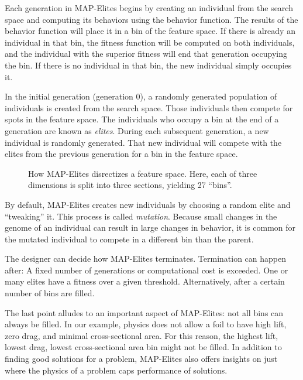 \documentclass{sig-alternate}
\begin{document}
Each generation in MAP-Elites begins by creating an individual from the search space and computing its behaviors using the behavior function.
The results of the behavior function will place it in a bin of the feature space.
If there is already an individual in that bin, the fitness function will be computed on both individuals, and the individual with the superior fitness will end that generation occupying the bin.
If there is no individual in that bin, the new individual simply occupies it.

In the initial generation (generation 0), a randomly generated population of individuals is created from the search space.
Those individuals then compete for spots in the feature space.
The individuals who occupy a bin at the end of a generation are known as \textit{elites}.
During each subsequent generation, a new individual is randomly generated.
That new individual will compete with the elites from the previous generation for a bin in the feature space.

\begin{figure}[tb]
\centering
{}
\caption{How MAP-Elites disrectizes a feature space. Here, each of three dimensions is split into three sections, yielding 27 ``bins''.}
\label{fig:FeatureSpace}
\end{figure}

By default, MAP-Elites creates new individuals by choosing a random elite and ``tweaking'' it.
This process is called \textit{mutation}.
Because small changes in the genome of an individual can result in large changes in behavior, it is common for the mutated individual to compete in a different bin than the parent.

The designer can decide how MAP-Elites terminates.
Termination can happen  after:
A fixed number of generations or computational cost is exceeded.
One or many elites have a fitness over a given threshold.
Alternatively, after a certain number of bins are filled.


The last point alludes to an important aspect of MAP-Elites: not all bins can always be filled.
In our example, physics does not allow a foil to have high lift, zero drag, and minimal cross-sectional area.
For this reason, the highest lift, lowest drag, lowest cross-sectional area bin might not be filled.
In addition to finding good solutions for a problem, MAP-Elites also offers insights on just where the physics of a problem caps performance of solutions.

\label{MAPElitesSub}
\end{document}
